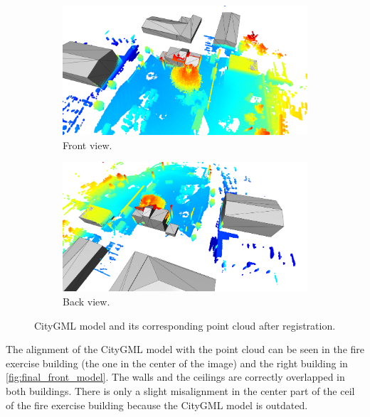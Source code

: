         \begin{figure}[H]
            \centering
            \begin{subfigure}{1\textwidth}
                \centering
                \includegraphics[scale=0.2]{images/solution_images/final_front.png}
                \caption{Front view.}
                \label{fig:final_front_model}
            \end{subfigure}
            \hfill
            \begin{subfigure}{1\textwidth}
                \centering
                \includegraphics[scale=0.2]{images/solution_images/final_back.png}
                \caption{Back view.}
                \label{fig:final_back_model}
            \end{subfigure}
            \caption{CityGML model and its corresponding point cloud after registration.}
            \label{fig:final_CityGML}
        \end{figure}
        
        The alignment of the CityGML model with the point cloud can be seen in the fire exercise building (the one in the center of the image)
        and the right building in \autoref{fig:final_front_model}. The walls and the ceilings are correctly overlapped in both buildings.
        There is only a slight misalignment in the center part of the ceil of the fire exercise building because the CityGML model is outdated.

